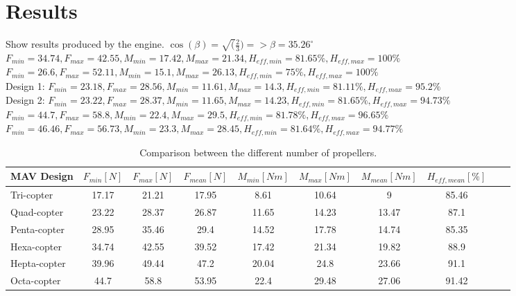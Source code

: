 \chapter{Results}
\label{sec:results}

Show results produced by the engine.
$\cos(\beta) = \sqrt(\frac{2}{3}) =>  \beta = 35.26^{\circ} $ \\
$F_{min} = 34.74, F_{max} = 42.55 , M_{min} = 17.42,  M_{max} = 21.34,  H_{eff,min} = 81.65\%,  H_{eff,max} = 100\%$\\
$F_{min} = 26.6, F_{max} = 52.11 , M_{min} = 15.1,  M_{max} = 26.13,  H_{eff,min} = 75\%,  H_{eff,max} = 100\%$\\
Design 1: $F_{min} = 23.18, F_{max} = 28.56 , M_{min} = 11.61,  M_{max} = 14.3,  H_{eff,min} = 81.11\%,  H_{eff,max} = 95.2\%$\\
Design 2: $F_{min} = 23.22, F_{max} = 28.37 , M_{min} = 11.65,  M_{max} = 14.23,  H_{eff,min} = 81.65\%, H_{eff,max} = 94.73\%$\\
$F_{min} = 44.7, F_{max} = 58.8 , M_{min} = 22.4,  M_{max} = 29.5,  H_{eff,min} = 81.78\%,  H_{eff,max} = 96.65\%$\\
$F_{min} = 46.46, F_{max} = 56.73 , M_{min} = 23.3,  M_{max} = 28.45,  H_{eff,min} = 81.64\%, H_{eff,max} = 94.77\%$\\

\begin{table}[h]
\begin{center}
 \caption{Comparison between the different number of propellers.}\vspace{1ex}
 \label{tab:tabnefz}
 \begin{tabular}{l|ccccccccc}
 \hline
 MAV Design & $F_{min} [N]$ & $F_{max} [N]$ & $F_{mean} [N]$ & $M_{min} [Nm]$ & $M_{max} [Nm]$ & $M_{mean} [Nm]$ & $H_{eff,mean} [\%]$ \\ \hline \hline
 Tri-copter  & 17.17 & 21.21 & 17.95 & 8.61 & 10.64 & 9 & 85.46\\
 Quad-copter & 23.22 & 28.37 & 26.87 & 11.65 & 14.23 & 13.47& 87.1 \\
 Penta-copter  & 28.95 & 35.46 & 29.4 & 14.52 & 17.78 & 14.74 & 85.35\\
 Hexa-copter  & 34.74 & 42.55 & 39.52 & 17.42 & 21.34 & 19.82 & 88.9\\
 Hepta-copter  & 39.96 & 49.44 & 47.2 & 20.04 & 24.8 & 23.66 & 91.1\\
 Octa-copter  & 44.7 & 58.8 & 53.95 & 22.4 & 29.48 & 27.06 & 91.42\\
 \hline
 \end{tabular}
\end{center}
\end{table}
